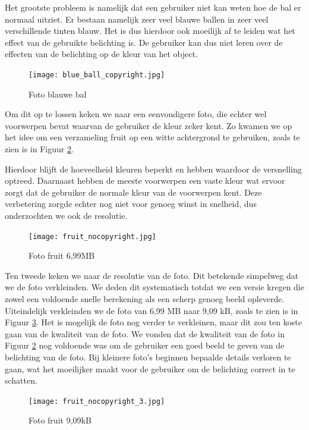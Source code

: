 Het grootste probleem is namelijk dat een gebruiker niet kan weten hoe de bal er normaal uitziet. Er bestaan namelijk zeer veel blauwe ballen in zeer veel verschillende tinten blauw. Het is dus hierdoor ook moeilijk af te leiden wat het effect van de gebruikte belichting is. De gebruiker kan dus niet leren over de effecten van de belichting op de kleur van het object.

\begin{figure}[H]
    \centering
    \texttt{[image: blue\_ball\_copyright.jpg]}
    \caption{Foto blauwe bal}%
    \label{fig:blue_ball}
\end{figure}

Om dit op te lossen keken we naar een eenvoudigere foto, die echter wel voorwerpen bevat waarvan de gebruiker de kleur zeker kent. Zo kwamen we op het idee om een verzameling fruit op een witte achtergrond te gebruiken, zoals te zien is in Figuur \ref{fig:fruit}.

Hierdoor blijft de hoeveelheid kleuren beperkt en hebben waardoor de versnelling optreed. Daarnaast hebben de meeste voorwerpen een vaste kleur wat ervoor zorgt dat de gebruiker de normale kleur van de voorwerpen kent. Deze verbetering zorgde echter nog niet voor genoeg winst in snelheid, dus onderzochten we ook de resolutie.

\begin{figure}[H]
    \centering
    \texttt{[image: fruit\_nocopyright.jpg]}
    \caption{Foto fruit 6,99MB}%
    \label{fig:fruit}
\end{figure}

Ten tweede keken we naar de resolutie van de foto. Dit betekende simpelweg dat we de foto verkleinden. We deden dit systematisch totdat we een versie kregen die zowel een voldoende snelle berekening als een scherp genoeg beeld opleverde. Uiteindelijk verkleinden we de foto van 6,99 MB naar 9,09 kB, zoals te zien is in Figuur \ref{fig:fruit_small}. Het is mogelijk de foto nog verder te verkleinen, maar dit zou ten koste gaan van de kwaliteit van de foto. We vonden dat de kwaliteit van de foto in Figuur \ref{fig:fruit} nog voldoende was om de gebruiker een goed beeld te geven van de belichting van de foto. Bij kleinere foto's beginnen bepaalde details verloren te gaan, wat het moeilijker maakt voor de gebruiker om de belichting correct in te schatten.

\begin{figure}[H]
    \centering
    \texttt{[image: fruit\_nocopyright\_3.jpg]}
    \caption{Foto fruit 9,09kB}%
    \label{fig:fruit_small}
\end{figure}

